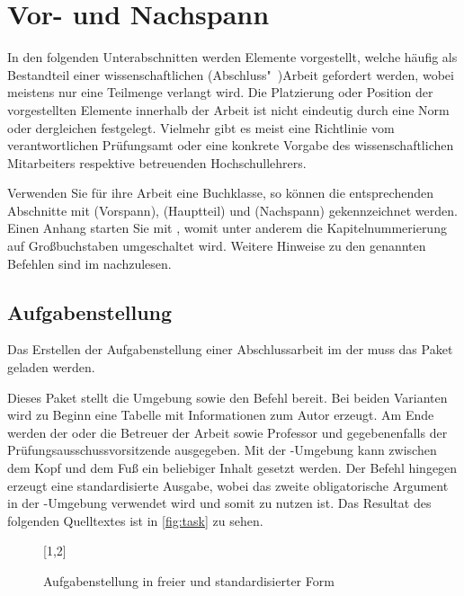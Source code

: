 \documentclass[%
  english,ngerman,%
  cdgeometry=no,DIV=12,automark,%
]{tudscrartcl}
\begin{document}
\section{Vor- und Nachspann}
In den folgenden Unterabschnitten werden Elemente vorgestellt, welche häufig 
als Bestandteil einer wissenschaftlichen (Abschluss"~)Arbeit gefordert werden, 
wobei meistens nur eine Teilmenge verlangt wird. Die Platzierung oder Position 
der vorgestellten Elemente innerhalb der Arbeit ist nicht eindeutig durch eine 
Norm oder dergleichen festgelegt. Vielmehr gibt es meist eine Richtlinie vom 
verantwortlichen Prüfungsamt oder eine konkrete Vorgabe des wissenschaftlichen 
Mitarbeiters respektive betreuenden Hochschullehrers.

Verwenden Sie für ihre Arbeit eine Buchklasse, so können die entsprechenden 
Abschnitte mit  (Vorspann),  (Hauptteil) 
und  (Nachspann) gekennzeichnet werden. Einen Anhang starten 
Sie mit , womit unter anderem die Kapitelnummerierung auf 
Großbuchstaben umgeschaltet wird. Weitere Hinweise zu den genannten Befehlen 
sind im \scrguide nachzulesen.


\subsection{Aufgabenstellung}
\label{sec:task}
Das Erstellen der Aufgabenstellung einer Abschlussarbeit im \CD der \TnUD muss 
das Paket  geladen werden.
%
\begin{Preamble}
\usepackage{tudscrsupervisor}

\end{Preamble}
%
Dieses Paket stellt die Umgebung  sowie den Befehl 
 bereit. Bei beiden Varianten wird zu Beginn eine Tabelle mit 
Informationen zum Autor erzeugt. Am Ende werden der oder die Betreuer der 
Arbeit sowie Professor und gegebenenfalls der Prüfungsausschussvorsitzende 
ausgegeben. Mit der -Umgebung kann zwischen dem Kopf und dem 
Fuß ein beliebiger Inhalt gesetzt werden. Der Befehl  hingegen 
erzeugt eine standardisierte Ausgabe, wobei das zweite obligatorische Argument 
in der -Umgebung verwendet wird und somit  zu 
nutzen ist. Das Resultat des folgenden Quelltextes ist in \autoref{fig:task} zu 
sehen. 
%
\begin{figure}
[1,2]
\caption{Aufgabenstellung in freier und standardisierter Form}
\label{fig:task}
\end{figure}
\end{document}
